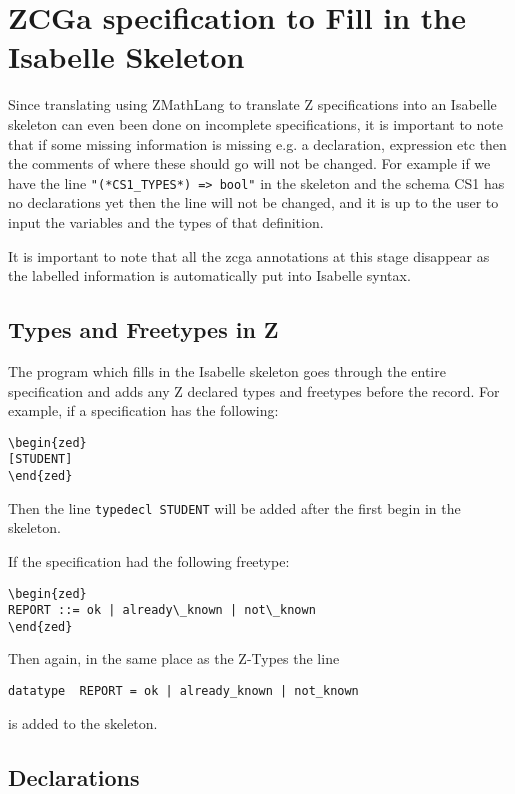 \section{ZCGa specification to Fill in the Isabelle Skeleton}
\label{sec:zcga2fillin}

Since translating using ZMathLang to translate Z specifications into an Isabelle
skeleton can even been done on incomplete specifications, it is important to
note that if some missing information is missing e.g. a declaration, expression
etc then the comments of where these should go will not be changed. For example
if we have the line \verb|"(*CS1_TYPES*) => bool"| in the skeleton and the
schema CS1 has no declarations yet then the line will not be changed, and it is
up to the user to input the variables and the types of that definition.

It is important to note that all the \gls{zcga} annotations at this stage
disappear as the labelled information is automatically put into Isabelle syntax.

\subsection{Types and Freetypes in Z}

The program which fills in the Isabelle skeleton goes through the entire
specification and adds any Z declared types and freetypes before the record. For
example, if a specification has the following:
\begin{verbatim}
\begin{zed}
[STUDENT]
\end{zed}
\end{verbatim}

Then the line \verb|typedecl STUDENT| will be added after the first begin in the
skeleton.

If the specification had the following freetype:
\begin{verbatim}
\begin{zed} 
REPORT ::= ok | already\_known | not\_known
\end{zed}
\end{verbatim}

Then again, in the same place as the Z-Types the line
\begin{verbatim}
datatype  REPORT = ok | already_known | not_known
\end{verbatim}
is added to the skeleton.

\subsection{Declarations}

